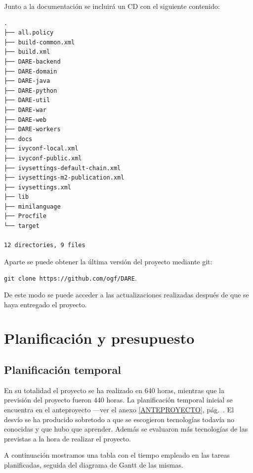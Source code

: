 Junto a la documentación se incluirá un CD con el siguiente contenido:

\begin{verbatim}
.
├── all.policy
├── build-common.xml
├── build.xml
├── DARE-backend
├── DARE-domain
├── DARE-java
├── DARE-python
├── DARE-util
├── DARE-war
├── DARE-web
├── DARE-workers
├── docs
├── ivyconf-local.xml
├── ivyconf-public.xml
├── ivysettings-default-chain.xml
├── ivysettings-m2-publication.xml
├── ivysettings.xml
├── lib
├── minilanguage
├── Procfile
└── target

12 directories, 9 files
\end{verbatim}

Aparte se puede obtener la última versión del proyecto mediante git:

\verb+git clone https://github.com/ogf/DARE+.

De este modo se puede acceder a las actualizaciones realizadas después
de que se haya entregado el proyecto.

\section{Planificación y presupuesto}
\subsection{Planificación temporal}
En su totalidad el proyecto se ha realizado en 640 horas, mientras que
la previsión del proyecto fueron 440 horas. La planificación temporal
inicial se encuentra en el anteproyecto ---ver el anexo
\ref{ANTEPROYECTO}, pág.~\pageref{ANTEPROYECTO}. El desvío se ha
producido sobretodo a que se escogieron tecnologías todavía no
conocidas y que hubo que aprender. Además se evaluaron más tecnologías
de las previstas a la hora de realizar el proyecto.

A continuación mostramos una tabla con el tiempo empleado en las
tareas planificadas, seguida del diagrama de Gantt de las mismas.

